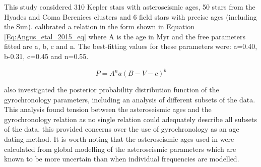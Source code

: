 This study considered 310 Kepler stars with asteroseismic ages, 50 stars from the Hyades and Coma Berenices clusters and 6 field stars with precise ages (including the Sun). \citet{Angus_etal_2015} calibrated a relation in the form shown in Equation \ref{Eq:Angus_etal_2015_eq} where A is the age in Myr and the free parameters fitted are a, b, c and n. The best-fitting values for these parameters were: a=0.40, b-0.31, c=0.45 and n=0.55.

\begin{equation}
    P = A^{n}a(B - V - c)^{b}
    \label{Eq:Angus_etal_2015_eq}
\end{equation}

\citet{Angus_etal_2015} also investigated the posterior probability distribution function of the gyrochronology parameters, including an analysis of different subsets of the data. This analysis found tension between the asteroseismic ages and the gyrochronology relation as no single relation could adequately describe all subsets of the data. this provided concerns over the use of gyrochronology as an age dating method. It is worth noting that the asteroseismic ages used in \citet{Angus_etal_2015} were calculated from global modelling of the asteroseismic parameters which are known to be more uncertain than when individual frequencies are modelled.

